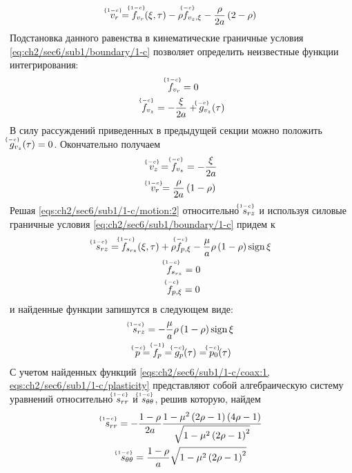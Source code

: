 \begin{equation*}
  \uindex{v}{1-c}_{r} = \uindex{f}{1-c}_{v_{r}}(\xi, \tau) -\rho \uindex{f}{-c}_{v_{z},\xi} - \frac{\rho}{2a}\left(2-\rho\right)
\end{equation*}
Подстановка данного равенства в кинематические граничные условия \cref{eq:ch2/sec6/sub1/boundary/1-c} позволяет определить неизвестные функции интегрирования:
\begin{gather*}
  \uindex{f}{1-c}_{v_{r}} = 0
  \\
  \uindex{f}{-c}_{v_{z}} = -\frac{\xi}{2a} + \uindex{g}{-c}_{v_{z}}(\tau)
\end{gather*}
В силу рассуждений приведенных в предыдущей секции можно положить $\uindex{g}{-c}_{v_{z}}(\tau) = 0$. Окончательно получаем
\begin{gather}
  \label{sol:ch2/sec6/sub1/vz/-c}
  \uindex{v}{-c}_{z} = \uindex{f}{-c}_{v_{z}} = -\frac{\xi}{2a}
  \\
  \label{sol:ch2/sec6/sub1/vr/1-c}
  \uindex{v}{1-c}_{r} =  \frac{\rho}{2a}\left(1-\rho\right)
\end{gather}
Решая \cref{eqs:ch2/sec6/sub1/1-c/motion:2} относительно $\uindex{s}{1-c}_{rz}$ и используя силовые граничные условия \cref{eq:ch2/sec6/sub1/boundary/1-c} придем к
\begin{gather*}
  \uindex{s}{1-c}_{rz} = \uindex{f}{1-c}_{s_{rz}}(\xi, \tau) + \rho \uindex{f}{-c}_{p,\xi} - \frac{\mu}{a} \rho\left(1-\rho\right)\sign\xi
  \\
  \uindex{f}{1-c}_{s_{rz}} = 0
  \\
  \uindex{f}{-c}_{p,\xi} = 0
\end{gather*}
и найденные функции запишутся в следующем виде:
\begin{gather}
  \label{sol:ch2/sec6/sub1/srz/1-c}
  \uindex{s}{1-c}_{rz} = - \frac{\mu}{a} \rho\left(1-\rho\right)\sign\xi
  \\
  \label{sol:ch2/sec6/sub1/p/-c}
  \uindex{p}{-c}=\uindex{f}{-1}_{p} = \uindex{g}{-c}_{p}(\tau) = \uindex{p}{-c}_{0}(\tau)
\end{gather}
С учетом найденных функций \cref{eqs:ch2/sec6/sub1/1-c/coax:1, eqs:ch2/sec6/sub1/1-c/plasticity} представляют собой алгебраическую систему уравнений относительно $\uindex{s}{1-c}_{rr}$ и $\uindex{s}{1-c}_{\theta\theta}$, решив которую, найдем
\begin{gather}
  \label{sol:ch2/sec6/sub1/srr/1-c}
  \uindex{s}{1-c}_{rr} = -\frac{1-\rho}{2a}\frac{1-\mu^2\left(2\rho-1\right)\left(4\rho-1\right)}{\sqrt{1-\mu^2\left(2\rho-1\right)^2}}
  \\
  \label{sol:ch2/sec6/sub1/stt/1-c}
  \uindex{s}{1-c}_{\theta\theta} = \frac{1-\rho}{a}\sqrt{1-\mu^2\left(2\rho-1\right)^2}
\end{gather}
